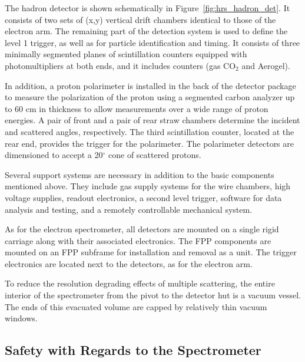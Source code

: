 {The hadron detector is shown schematically in 
Figure~\ref{fig:hrs_hadron_det}.  It consists 
of two sets of (x,y) vertical drift chambers identical to those of the 
electron arm.  The remaining part of the detection system is used to 
define the level 1 trigger, as well as for particle identification and 
timing.  It consists of three minimally segmented planes of 
scintillation counters equipped with photomultipliers at both ends, and 
it includes \Cherenkov{} counters (gas CO$_2$ and Aerogel).

In addition, a proton polarimeter is installed in the back of the 
detector package to measure the polarization of the proton using a 
segmented carbon analyzer up to 60 cm in thickness to allow measurements 
over a wide range of proton energies.  A pair of front and a pair of 
rear straw chambers determine the incident and 
scattered angles, respectively.  The third scintillation counter, 
located at the rear end, provides the trigger for the polarimeter.  The 
polarimeter detectors are dimensioned to accept a 20$^{\circ}$ cone of 
scattered protons.

Several support systems are necessary in addition to the basic 
components mentioned above.  They include gas supply systems for the 
wire chambers, high voltage supplies, readout electronics, a second 
level trigger, software for data analysis and testing, and a remotely 
controllable mechanical system.

As for the electron spectrometer, all detectors are mounted on a 
single rigid carriage along with their associated electronics.  The FPP 
components are mounted on an FPP subframe for installation and removal as 
a unit.  The trigger electronics are located next to the detectors, 
as for the electron arm.

} %

To reduce the resolution degrading effects of multiple scattering, the 
entire interior of the spectrometer from the pivot to the detector hut 
is a vacuum vessel.  The ends of this evacuated volume are capped by 
relatively thin vacuum windows.


\begin{safetyen}{10}{15}
\section{Safety with Regards to the Spectrometer}
\label{sec:hrs-safety}
\end{safetyen}

